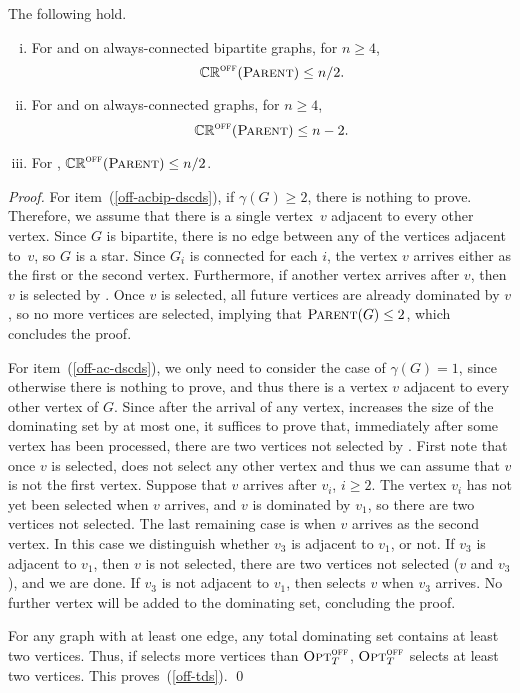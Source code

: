 \begin{proposition}
\label{prop:cds-bip}
The following hold.
\begin{enumerate}[(i)]
\item \label{off-acbip-dscds}
 For \ds and \cds on always-connected bipartite graphs, for $n\geq 4$,
 $$\mathbb{CR}^{\textsc{off}}(\operatorname{\textsc{Parent}})\leq n/2.$$
\item \label{off-ac-dscds}
 For \ds and \cds on always-connected graphs, for $n\geq 4$,
$$\mathbb{CR}^{\textsc{off}}(\operatorname{\textsc{Parent}}) \le n-2.$$
\item \label{off-tds}
 For \tds, $\mathbb{CR}^{\textsc{off}}(\operatorname{\textsc{Parent}})\leq n/2$.
\end{enumerate}
\end{proposition}
\begin{proof}
For item~(\ref{off-acbip-dscds}), if $\gamma(G) \ge 2$, there is
nothing to prove. 
Therefore, we assume that there is a single vertex~$v$
adjacent to every other vertex. Since $G$ is bipartite, there is no 
edge between any of the vertices adjacent to~$v$, so $G$ is a star.
Since $G_i$ is connected for each $i$, the vertex $v$ arrives either
as the first or the second vertex. Furthermore, if another vertex arrives 
after $v$, then $v$ is selected by \aparent. Once $v$ is selected,
all future vertices are already dominated by $v$, so no
more vertices are selected, implying that $\operatorname{\textsc{Parent}}(G)\le 2$,
which concludes the proof. 

For item~(\ref{off-ac-dscds}), we  only need to consider the case of
$\gamma(G) = 1$,  since otherwise there is 
nothing to prove, and thus there is a vertex $v$ adjacent
to every other vertex of $G$.
Since after the arrival of any vertex, \aparent increases
the size of the dominating set by 
at most one, it suffices to prove that, immediately after some vertex has
been processed, there are two vertices not selected by \aparent.
First note that once $v$ is selected, \aparent does not select
any other vertex and thus we can assume that $v$ is not the first vertex.
Suppose that $v$ arrives after $v_i$, $i\geq 2$. The vertex $v_i$ has not yet
been selected when $v$ arrives, and $v$ is dominated by $v_1$, so there
are two vertices not selected.
The last remaining case is 
when $v$ arrives as the second vertex. In this case we distinguish whether
$v_3$ is adjacent to $v_1$, or not. If $v_3$ is adjacent to $v_1$,
then $v$ is not selected,
there are two vertices not selected ($v$ and $v_3$), and we are done.
If $v_3$ is not
adjacent to $v_1$, then \aparent selects $v$ when $v_3$ arrives.
No further vertex will be added to the dominating set, concluding the proof.

For any graph with at least one edge, any total dominating set contains
at least two vertices.
Thus, if \aparent selects more vertices than $\operatorname{\textsc{Opt}}^\textsc{off}_T$, $\operatorname{\textsc{Opt}}^\textsc{off}_T$ selects
at least two vertices.
This proves~(\ref{off-tds}).
\qed\end{proof}

